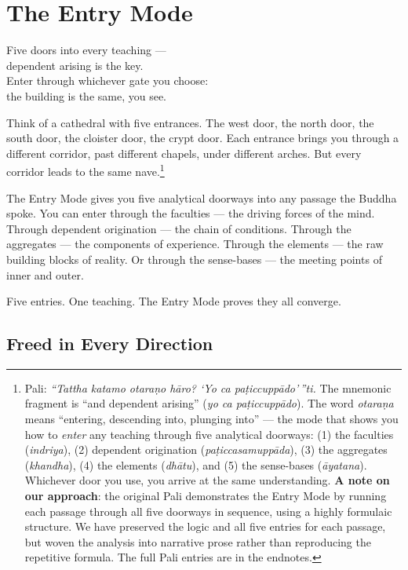 \chapter{The Entry Mode}
\label{ch:entry}

\begin{versebox}
Five doors into every teaching ---\\
dependent arising is the key.\\
Enter through whichever gate you choose:\\
the building is the same, you see.
\end{versebox}

\noindent Think of a cathedral with five entrances. The west door, the north door, the south door, the cloister door, the crypt door. Each entrance brings you through a different corridor, past different chapels, under different arches. But every corridor leads to the same nave.\footnote{Pali: \textit{``Tattha katamo otaraṇo hāro? `Yo ca paṭiccuppādo'\,''ti.} The mnemonic fragment is ``and dependent arising'' (\textit{yo ca paṭiccuppādo}). The word \textit{otaraṇa} means ``entering, descending into, plunging into'' --- the mode that shows you how to \textit{enter} any teaching through five analytical doorways: (1) the faculties (\textit{indriya}), (2) dependent origination (\textit{paṭiccasamuppāda}), (3) the aggregates (\textit{khandha}), (4) the elements (\textit{dhātu}), and (5) the sense-bases (\textit{āyatana}). Whichever door you use, you arrive at the same understanding. \textbf{A note on our approach}: the original Pali demonstrates the Entry Mode by running each passage through all five doorways in sequence, using a highly formulaic structure. We have preserved the logic and all five entries for each passage, but woven the analysis into narrative prose rather than reproducing the repetitive formula. The full Pali entries are in the endnotes.}

The Entry Mode gives you five analytical doorways into any passage the Buddha spoke. You can enter through the faculties --- the driving forces of the mind. Through dependent origination --- the chain of conditions. Through the aggregates --- the components of experience. Through the elements --- the raw building blocks of reality. Or through the sense-bases --- the meeting points of inner and outer.

Five entries. One teaching. The Entry Mode proves they all converge.

\section*{Freed in Every Direction}

